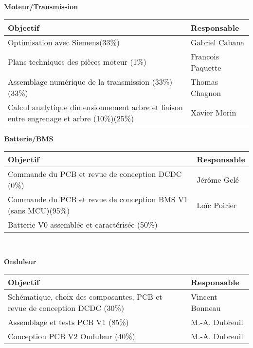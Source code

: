 \textbf{\large Moteur/Transmission}\\
\begin{tabularx}{\linewidth}{
    |>{\hsize=1.75\hsize}X|%
    >{\hsize=0.25\hsize}X|%
  }
    \hline
    \textbf{Objectif} & \textbf{Responsable} \\\hline
     Optimisation avec Siemens(33\%)  & Gabriel Cabana \\\hline
     Plans techniques des pièces moteur (1\%)  & Francois Paquette \\\hline
     Assemblage numérique de la transmission (33\%)(33\%)  &  Thomas Chagnon\\\hline
     Calcul analytique dimensionnement arbre et liaison entre engrenage et arbre (10\%)(25\%) & Xavier Morin\\\hline
\end{tabularx}
\medskip

\textbf{\large Batterie/BMS}
\\
\begin{tabularx}{\linewidth}{
    |>{\hsize=1.75\hsize}X|%
    >{\hsize=0.25\hsize}X|%
  }
    \hline
    \textbf{Objectif} & \textbf{Responsable} \\\hline
    Commande du PCB et revue de conception DCDC (0\%)  & Jérôme Gelé \\\hline 
    Commande du PCB et revue de conception BMS V1 (sans MCU)(95\%) & Loïc Poirier\\\hline
    Batterie V0 assemblée et caractérisée (50\%)
\end{tabularx}\\
\medskip

\textbf{\large Onduleur}\\
\begin{tabularx}{\linewidth}{
    |>{\hsize=1.75\hsize}X|%
    >{\hsize=0.25\hsize}X|%
  }
    \hline
    \textbf{Objectif} & \textbf{Responsable} \\\hline
    Schématique, choix des composantes, PCB et revue de conception DCDC (30\%)  & Vincent Bonneau \\\hline
     Assemblage et tests PCB V1 (85\%) & M.-A. Dubreuil\\\hline
     Conception PCB V2 Onduleur (40\%) & M.-A. Dubreuil\\\hline
\end{tabularx}
\medskip

